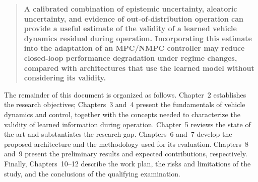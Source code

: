 \documentclass[12pt,a4paper]{report}
\begin{document}
%
\begin{quote}
\textbf{A calibrated combination of epistemic uncertainty, aleatoric uncertainty, and evidence of out-of-distribution operation can provide a useful estimate of the validity of a learned vehicle dynamics residual during operation. Incorporating this estimate into the adaptation of an MPC/NMPC controller may reduce closed-loop performance degradation under regime changes, compared with architectures that use the learned model without considering its validity.}
\end{quote}



The remainder of this document is organized as follows. Chapter~2 establishes the research objectives; Chapters~3 and~4 present the fundamentals of vehicle dynamics and control, together with the concepts needed to characterize the validity of learned information during operation. Chapter~5 reviews the state of the art and substantiates the research gap. Chapters~6 and~7 develop the proposed architecture and the methodology used for its evaluation. Chapters~8 and~9 present the preliminary results and expected contributions, respectively. Finally, Chapters~10--12 describe the work plan, the risks and limitations of the study, and the conclusions of the qualifying examination.
\end{document}
